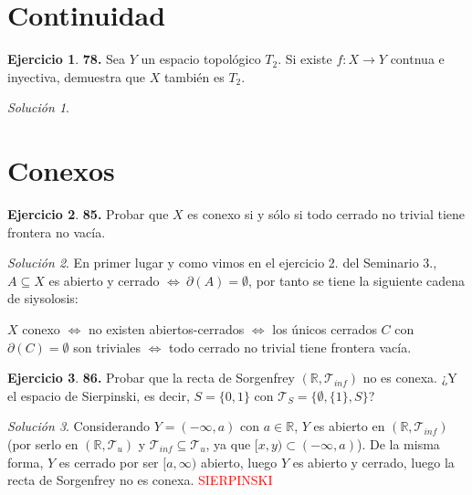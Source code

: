 \documentclass[12pt,twoside]{report}
\newcommand\mc[1]{\mathcal{#1}}
\theoremstyle{azul}
\theoremstyle{azul2}
\theoremstyle{plain}
\theoremstyle{definition}
\newtheorem*{ejer}{Ejercicio}
\theoremstyle{remark}
\newtheorem*{sol}{Solución}
\begin{document}
\section{Continuidad}
\begin{ejer}
    \textbf{78.} Sea $Y$ un espacio topológico $T_2$. Si existe $f:X\longrightarrow Y$ contnua e inyectiva, demuestra que $X$ también es $T_2$.
\end{ejer}
\begin{sol}
    
\end{sol}
\section{Conexos}
\begin{ejer}
\textbf{85.} Probar que $X$ es conexo si y sólo si todo cerrado no trivial tiene frontera no vacía. 
\end{ejer}
\begin{sol}
    En primer lugar y como vimos en el ejercicio 2. del Seminario 3., $A \subseteq X$ es abierto y cerrado $\iff \: \partial (A)=\emptyset$,  por tanto se tiene la siguiente cadena de siysolosis:

    $X$ conexo $\iff$ no existen abiertos-cerrados $\iff$ los únicos cerrados $C$ con $\partial (C)=\emptyset$ son triviales $\iff$ todo cerrado no trivial tiene frontera vacía.
\end{sol}
\begin{ejer}
    \textbf{86.} Probar que la recta de Sorgenfrey $(\mathbb{R}, \mc{T}_{inf})$ no es conexa. ¿Y el espacio de Sierpinski, es decir, $S=\{0,1\}$ con $\mc{T}_S=\{\emptyset, \{1\}, S\}$?
\end{ejer}
\begin{sol}
    Considerando $Y=(-\infty,a)$ con $a \in \mathbb{R}$, $Y$ es abierto en $(\mathbb{R}, \mc{T}_{inf})$ (por serlo en $(\mathbb{R}, \mc{T}_{u})$ y $\mc{T}_{inf} \subseteq \mc{T}_u$, ya que $[x,y) \subset (-\infty,a)$). De la misma forma, $Y$ es cerrado por ser $[a,\infty)$ abierto, luego $Y$ es abierto y cerrado, luego la recta de Sorgenfrey no es conexa. \textcolor{red}{SIERPINSKI}
\end{sol}
\end{document}
